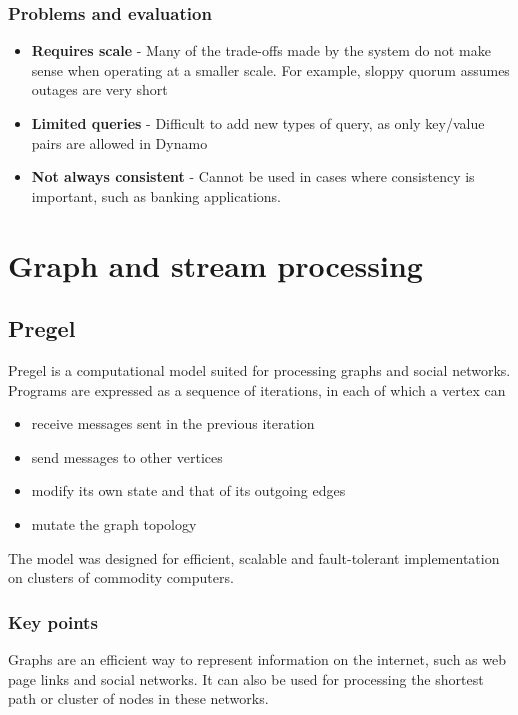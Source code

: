 \documentclass{sty/SizheArticle}
\begin{document}
\subsubsection{Problems and evaluation}
\begin{itemize}
\item \textbf{Requires scale} - Many of the trade-offs made by the system
do not make sense when operating at a smaller scale. For example, sloppy
quorum assumes outages are very short
\item \textbf{Limited queries} - Difficult to add new types of query, as only
key/value pairs are allowed in Dynamo
\item \textbf{Not always consistent} - Cannot be used in cases where
consistency is important, such as banking applications.
\end{itemize}



\section{Graph and stream processing}
\subsection{Pregel}
Pregel is a computational model suited for processing graphs and social
networks. Programs are expressed as a sequence of iterations, in each of which
a vertex can 
\begin{itemize}
\item receive messages sent in the previous iteration
\item send messages to other vertices
\item modify its own state and that of its outgoing edges
\item mutate the graph topology
\end{itemize}
The model was designed for efficient, scalable and fault-tolerant implementation
on clusters of commodity computers.

\subsubsection{Key points}
Graphs are an efficient way to represent information on the internet,
such as web page links and social networks. It can also be used for processing
the shortest path or cluster of nodes in these networks.
\end{document}
